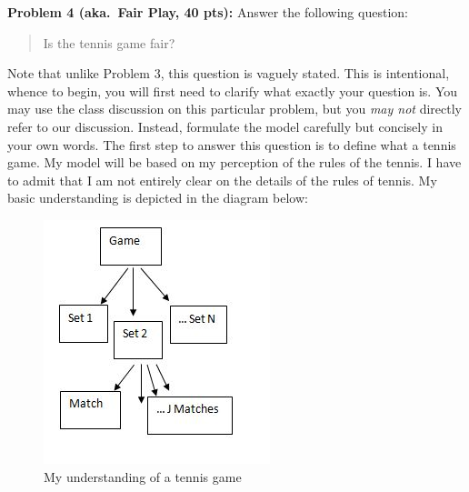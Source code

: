 \documentclass[12pt]{article}
\begin{document}
\vskip0.25in
\noindent\textbf{Problem 4 (aka.\ Fair Play, 40 pts):}
Answer the following question:
\begin{verse}
Is the tennis game fair?
\end{verse}
Note that unlike Problem 3, this question is vaguely stated.
This is intentional, whence to begin, you will first need to clarify
what exactly your question is.
You may use the class discussion on this particular 
problem, but you \emph{may not} directly refer to our 
discussion.  Instead, formulate the model carefully but concisely in 
your own words.   
The first step to answer this question is to define what a tennis game. My model will be based on my perception of the rules of the tennis. I have to admit that I am not entirely clear on the details of the rules of tennis. My basic understanding is depicted in the diagram below:
\begin{figure}[h]
    \begin{center}
        \includegraphics[width=\textwidth]{tennis.jpg}
    \end{center}
    \caption{My understanding of a tennis game}
    \label{fig:tennis}
\end{figure}
\newline
\end{document}

